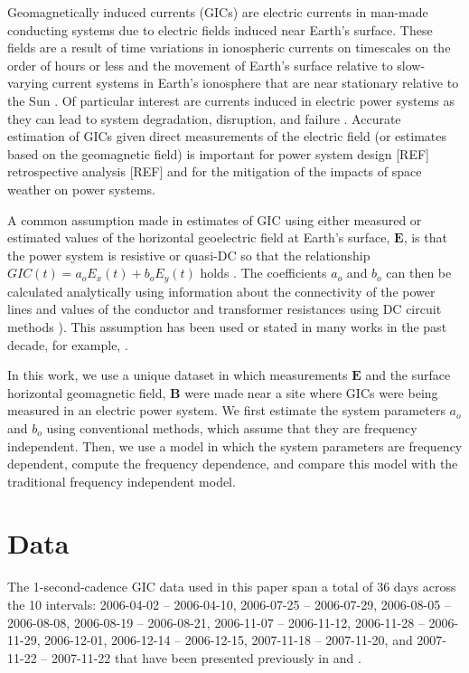 \documentclass[draft,linenumbers]{agujournal2018}
\begin{document}
Geomagnetically induced currents (GICs) are electric currents in man-made conducting systems due to electric fields induced near Earth's surface. These fields are a result of time variations in ionospheric currents on timescales on the order of hours or less \citep{Ohtani2000} and the movement of Earth's surface relative to slow-varying current systems in Earth's ionosphere that are near stationary relative to the Sun \citep{Stening2013}. Of particular interest are currents induced in electric power systems as they can lead to system degradation, disruption, and failure \citep{Albertson1993,NERC2012}. Accurate estimation of GICs given direct measurements of the electric field (or estimates based on the geomagnetic field) is important for power system design [REF] retrospective analysis [REF] and for the mitigation of the impacts of space weather on power systems.

A common assumption made in estimates of GIC using either measured or estimated values of the horizontal geoelectric field at Earth's surface, $\mathbf{E}$, is that the power system is resistive or quasi-DC so that the relationship $GIC(t) = a_oE_x(t) + b_oE_y(t)$ holds \citep{Albertson1981,Lehtinen1985}.  The coefficients $a_o$ and $b_o$ can then be calculated analytically using information about the connectivity of the power lines and values of the conductor and transformer resistances using DC circuit methods \citep[e.g.][]{Boteler2014a,Boteler2014b}). This assumption has been used or stated in many works in the past decade, for example, \citet{Pulkkinen2007,Wik2008,Pulkkinen2010,Ngwira2011,Viljanen2012,Overbye2012}.

In this work, we use a unique dataset in which measurements $\mathbf{E}$ and the surface horizontal geomagnetic field, $\mathbf{B}$ were made near a site where GICs were being measured in an electric power system.  We first estimate the system parameters $a_o$ and $b_o$ using conventional methods, which assume that they are frequency independent.  Then, we use a model in which the system parameters are frequency dependent, compute the frequency dependence, and compare this model with the traditional frequency independent model. 

\section{Data}

The 1-second-cadence GIC data used in this paper span a total of 36 days across the 10 intervals: 2006-04-02 -- 2006-04-10, 2006-07-25 -- 2006-07-29, 2006-08-05 -- 2006-08-08, 2006-08-19 -- 2006-08-21, 2006-11-07 -- 2006-11-12, 2006-11-28 -- 2006-11-29, 2006-12-01, 2006-12-14 -- 2006-12-15, 2007-11-18 -- 2007-11-20, and 2007-11-22 -- 2007-11-22 that have been presented previously in \citet{Watari2009} and \cite{Watari2015}.
\end{document}
